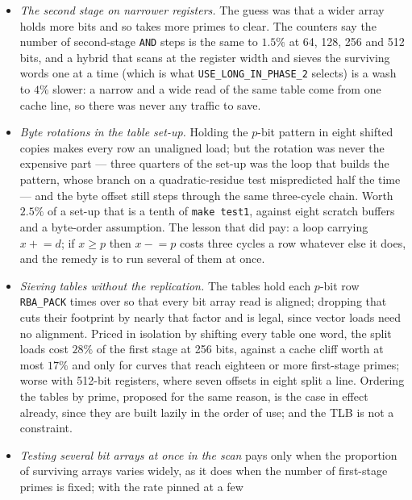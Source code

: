 \documentclass[12pt,a4paper,oneside]{amsart}
\begin{document}
\begin{itemize}
  \item \emph{The second stage on narrower registers.} The guess was that a
        wider array holds more bits and so takes more primes to clear. The
        counters say the number of second-stage \texttt{AND} steps is the same
        to $1.5\%$ at 64, 128, 256 and 512 bits, and a hybrid that scans at
        the register width and sieves the surviving words one at a time
        (which is what \texttt{USE\_LONG\_IN\_PHASE\_2} selects) is a wash to
        $4\%$ slower: a narrow and a wide read of the same table come from
        one cache line, so there was never any traffic to save.
  \item \emph{Byte rotations in the table set-up.} Holding the $p$-bit pattern
        in eight shifted copies makes every row an unaligned load; but the
        rotation was never the expensive part --- three quarters of the set-up
        was the loop that builds the pattern, whose branch on a
        quadratic-residue test mispredicted half the time --- and the byte
        offset still steps through the same three-cycle chain. Worth $2.5\%$
        of a set-up that is a tenth of \texttt{make test1}, against eight
        scratch buffers and a byte-order assumption. The lesson that did pay:
        a loop carrying $x \mathrel{+}= d$; if $x \ge p$ then $x \mathrel{-}= p$
        costs three cycles a row whatever else it does, and the remedy is to
        run several of them at once.
  \item \emph{Sieving tables without the replication.} The tables hold each
        $p$-bit row \texttt{RBA\_PACK} times over so that every bit array
        read is aligned; dropping that cuts their footprint by nearly that
        factor and is legal, since vector loads need no alignment. Priced in
        isolation by shifting every table one word, the split loads cost
        $28\%$ of the first stage at 256 bits, against a cache cliff worth at
        most $17\%$ and only for curves that reach eighteen or more
        first-stage primes; worse with 512-bit registers, where seven offsets
        in eight split a line. Ordering the tables by prime, proposed for the
        same reason, is the case in effect already, since they are built
        lazily in the order of use; and the TLB is not a constraint.
  \item \emph{Testing several bit arrays at once in the scan} pays only when
        the proportion of surviving arrays varies widely, as it does when the
        number of first-stage primes is fixed; with the rate pinned at a few

\end{itemize}
\end{document}
